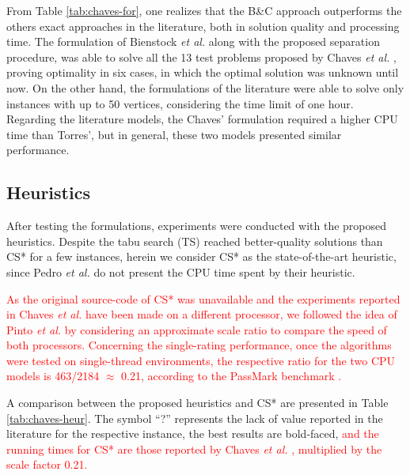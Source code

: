 \documentclass{ro}
\begin{document}
From Table \ref{tab:chaves-for}, one realizes that the B\&C approach outperforms the others exact approaches in the literature, both in solution quality and processing time. The formulation of Bienstock \textit{et al.} \cite{bienstock1993note} along with the proposed separation procedure, was able to solve all the 13 test problems proposed by Chaves \textit{et al.} \cite{chaves2005hybrid}, proving optimality in six cases, in which the optimal solution was unknown until now. On the other hand, the formulations of the literature were able to solve only instances with up to 50 vertices, considering the time limit of one hour. Regarding the literature models, the Chaves' formulation required a higher CPU time than Torres', but in general, these two models presented similar performance.



\subsection{Heuristics}

After testing the formulations, experiments were conducted with the proposed heuristics. Despite the tabu search (TS)\cite{pedro2013tabu}  reached better-quality solutions than CS* for a few instances, herein we consider CS* as the state-of-the-art heuristic, since Pedro \textit{et al.} \cite{pedro2013tabu} do not present the CPU time spent by their heuristic.




\textcolor{red}{As the original source-code of CS* was unavailable and the experiments reported in Chaves \textit{et al.}\cite{chaves2005hybrid} have been made on a different processor, we followed the idea of Pinto \textit{et al.} \cite{PINTO2018849} by considering an approximate scale ratio to compare the speed of both
processors. Concerning the single-rating performance, once the algorithms were tested on single-thread environments, the respective ratio for the two CPU models is 463/2184 $\approx$ 0.21, according to the PassMark benchmark \cite{passmark}.}

A comparison between the proposed heuristics and CS* are presented in Table  \ref{tab:chaves-heur}. The symbol ``?'' represents the lack of value reported in the literature for the respective instance,  the best results are bold-faced, \textcolor{red}{and the running times for CS* are those reported by Chaves \textit{et al.} \cite{chaves2005hybrid}, multiplied by the scale factor 0.21.}
\end{document}
